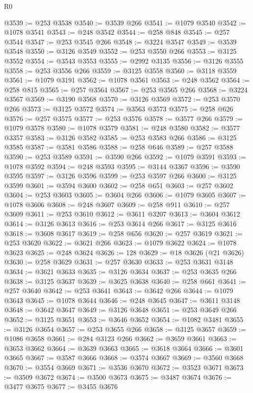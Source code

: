 \begin{lexlean}{R0}
\begin{coremodule}
@3539 := @253 @3538
@3540 := @3539 @266
@3541 := @1079 @3540
@3542 := @1078 @3541
@3543 := @248 @3542
@3544 := @258 @848
@3545 := @257 @3544
@3547 := @253 @3545 @266
@3548 := @3224 @3547
@3549 := @3539 @3548
@3550 := @3126 @3549
@3552 := @253 @3550 @266
@3553 := @3125 @3552
@3554 := @3543 @3553
@3555 := @2992 @3135
@3556 := @3126 @3555
@3558 := @253 @3556 @266
@3559 := @3125 @3558
@3560 := @3118 @3559
@3561 := @1079 @3191
@3562 := @1078 @3561
@3563 := @248 @3562
@3564 := @258 @815
@3565 := @257 @3564
@3567 := @253 @3565 @266
@3568 := @3224 @3567
@3569 := @3190 @3568
@3570 := @3126 @3569
@3572 := @253 @3570 @266
@3573 := @3125 @3572
@3574 := @3563 @3573
@3575 := @258 @626
@3576 := @257 @3575
@3577 := @253 @3576
@3578 := @3577 @266
@3579 := @1079 @3578
@3580 := @1078 @3579
@3581 := @248 @3580
@3582 := @3577 @3357
@3583 := @3126 @3582
@3585 := @253 @3583 @266
@3586 := @3125 @3585
@3587 := @3581 @3586
@3588 := @258 @646
@3589 := @257 @3588
@3590 := @253 @3589
@3591 := @3590 @266
@3592 := @1079 @3591
@3593 := @1078 @3592
@3594 := @248 @3593
@3595 := @3144 @3367
@3596 := @3590 @3595
@3597 := @3126 @3596
@3599 := @253 @3597 @266
@3600 := @3125 @3599
@3601 := @3594 @3600
@3602 := @258 @651
@3603 := @257 @3602
@3604 := @253 @3603
@3605 := @3604 @266
@3606 := @1079 @3605
@3607 := @1078 @3606
@3608 := @248 @3607
@3609 := @258 @911
@3610 := @257 @3609
@3611 := @253 @3610
@3612 := @3611 @3207
@3613 := @3604 @3612
@3614 := @3126 @3613
@3616 := @253 @3614 @266
@3617 := @3125 @3616
@3618 := @3608 @3617
@3619 := @258 @656
@3620 := @257 @3619
@3621 := @253 @3620
@3622 := @3621 @266
@3623 := @1079 @3622
@3624 := @1078 @3623
@3625 := @248 @3624
@3626 := 128
@3629 := @18 @3626 (@21 @3626)
@3630 := @258 @3629
@3631 := @257 @3630
@3633 := @253 @3631 @3148
@3634 := @3621 @3633
@3635 := @3126 @3634
@3637 := @253 @3635 @266
@3638 := @3125 @3637
@3639 := @3625 @3638
@3640 := @258 @661
@3641 := @257 @3640
@3642 := @253 @3641
@3643 := @3642 @266
@3644 := @1079 @3643
@3645 := @1078 @3644
@3646 := @248 @3645
@3647 := @3611 @3148
@3648 := @3642 @3647
@3649 := @3126 @3648
@3651 := @253 @3649 @266
@3652 := @3125 @3651
@3653 := @3646 @3652
@3654 := @1082 @3481
@3655 := @3126 @3654
@3657 := @253 @3655 @266
@3658 := @3125 @3657
@3659 := @1086 @3658
@3661 := @284 @3123 @266
@3662 := @3659 @3661
@3663 := @3653 @3662
@3664 := @3639 @3663
@3665 := @3618 @3664
@3666 := @3601 @3665
@3667 := @3587 @3666
@3668 := @3574 @3667
@3669 := @3560 @3668
@3670 := @3554 @3669
@3671 := @3536 @3670
@3672 := @3523 @3671
@3673 := @3509 @3672
@3674 := @3500 @3673
@3675 := @3487 @3674
@3676 := @3477 @3675
@3677 := @3455 @3676

\end{coremodule}
\end{lexlean}
